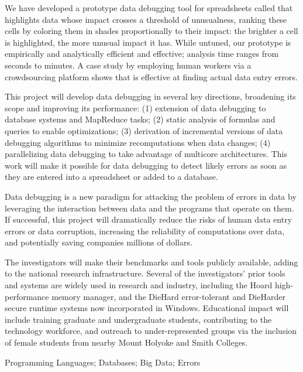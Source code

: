 We have developed a prototype data debugging tool for spreadsheets called
\checkcell{} that
 highlights data whose impact crosses a threshold of unusualness,
ranking these cells by coloring them in shades proportionally to their
impact: the brighter a cell is highlighted, the more unusual impact it
has.  While untuned, our prototype is empirically and analytically
efficient and effective; analysis time ranges from seconds to minutes.
A case study by employing human workers via a crowdsourcing platform
shows that \checkcell{} is effective at
finding actual data entry errors.

This project will develop data debugging in several key directions,
broadening its scope and improving its performance: (1) extension of
data debugging to database systems and MapReduce tasks; (2) static
analysis of formulas and queries to enable optimizations; (3)
derivation of incremental versions of data debugging algorithms to
minimize recomputations when data changes; (4) parallelizing data
debugging to take advantage of multicore architectures. This work will
make it possible for data debugging to detect likely errors as soon as
they are entered into a spreadsheet or added to a database.

\smallskip
{}
Data debugging is a new paradigm for attacking the problem of errors
in data by leveraging the interaction between data and the programs
that operate on them.  If successful, this project will dramatically
reduce the risks of human data entry errors or data corruption,
increasing the reliability of computations over data, and potentially
saving companies millions of dollars.

The investigators will make their benchmarks and tools publicly
available, adding to the national research infrastructure. Several of
the investigators' prior tools and systems are widely used in research
and industry, including the Hoard high-performance memory manager, and the
DieHard error-tolerant and DieHarder secure runtime systems now
incorporated in Windows. Educational impact will include training
graduate and undergraduate students, contributing to the technology
workforce, and outreach to under-represented groups via the inclusion
of female students from nearby Mount Holyoke and Smith Colleges.

\smallskip
{} Programming Languages; Databases; Big Data; Errors
